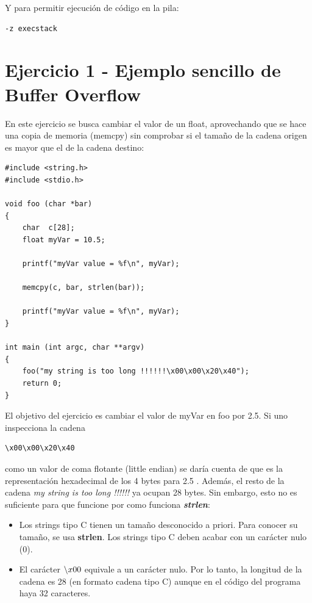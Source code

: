 \documentclass[]{article}
\begin{document}
Y para permitir ejecución de código en la pila:

\begin{verbatim}
-z execstack
\end{verbatim}



\newpage
\section{Ejercicio 1 - Ejemplo sencillo de Buffer Overflow}

En este ejercicio se busca cambiar el valor de un float, aprovechando que se hace una copia de memoria (memcpy) sin comprobar si el tamaño de la cadena origen es mayor que el de la cadena destino:

\begin{lstlisting}
#include <string.h>
#include <stdio.h>

void foo (char *bar)
{
	char  c[28];		   
	float myVar = 10.5;  
	
	printf("myVar value = %f\n", myVar);
	
	memcpy(c, bar, strlen(bar)); 
	
	printf("myVar value = %f\n", myVar);
}

int main (int argc, char **argv)
{
	foo("my string is too long !!!!!!\x00\x00\x20\x40");
	return 0;
}
\end{lstlisting}

El objetivo del ejercicio es cambiar el valor de myVar en foo por 2.5. Si uno inspecciona la cadena 

\begin{verbatim}
\x00\x00\x20\x40
\end{verbatim}

\noindent como un valor de coma flotante (little endian) se daría cuenta de que es la representación hexadecimal de los 4 bytes para 2.5  \cite{iee754}. Además, el resto de la cadena \textit{my string is too long !!!!!!} ya ocupan 28 bytes. Sin embargo, esto no es suficiente para que funcione por como funciona \textit{\textbf{strlen}}:

\begin{itemize}
	\item Los strings tipo C tienen un tamaño desconocido a priori. Para conocer su tamaño, se usa \textbf{strlen}. Los strings tipo C deben acabar con un carácter nulo (0). 
	\item El carácter $\symbol{92}x00$ equivale a un carácter nulo. Por lo tanto, la longitud de la cadena es 28 (en formato cadena tipo C) aunque en el código del programa haya 32 caracteres. 
\end{itemize}
\end{document}
